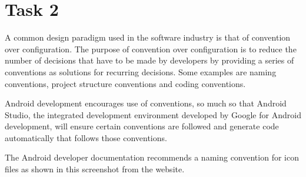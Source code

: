 \documentclass[11pt,english,numbers=endperiod,parskip=full]{scrartcl}
\begin{document}
\section{Task 2}
\raggedright
A common design paradigm used in the software industry is that of convention over configuration. The purpose of convention over configuration is to reduce the number of decisions that have to be made by developers by providing a series of conventions as solutions for recurring decisions. Some examples are naming conventions, project structure conventions and coding conventions.

Android development encourages use of conventions, so much so that Android Studio, the integrated development environment developed by Google for Android development, will ensure certain conventions are followed and generate code automatically that follows those conventions.

The Android developer documentation recommends a naming convention for icon files as shown in this screenshot from the website.
\end{document}
